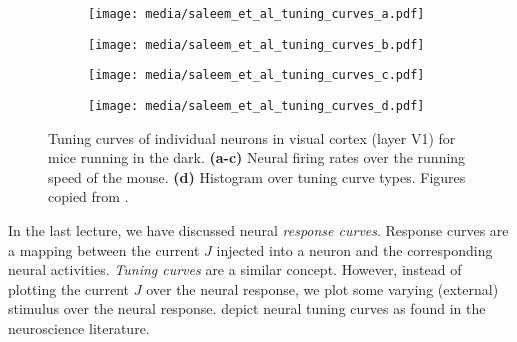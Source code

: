 \documentclass[10pt,letterpaper,oneside]{article}
\begin{document}
\begin{figure}[p]
	\hspace{0.5cm}
	\begin{subfigure}[b]{0.25\textwidth}%
		\centering%
		\hspace{-1cm}\texttt{[image: media/saleem\_et\_al\_tuning\_curves\_a.pdf]}%
		\caption{}%
		\label{fig:saleem_et_al_tuning_curves_a}%
	\end{subfigure}%
	\begin{subfigure}[b]{0.25\textwidth}%
		\centering%
		\hspace{-1cm}\texttt{[image: media/saleem\_et\_al\_tuning\_curves\_b.pdf]}%
		\caption{}%
		\label{fig:saleem_et_al_tuning_curves_b}%
	\end{subfigure}%
	\begin{subfigure}[b]{0.25\textwidth}%
		\centering%
		\hspace{-1cm}\texttt{[image: media/saleem\_et\_al\_tuning\_curves\_c.pdf]}%
		\caption{}%
		\label{fig:saleem_et_al_tuning_curves_c}%
	\end{subfigure}%
	\begin{subfigure}[b]{0.25\textwidth}%
		\centering%
		\hspace{-1cm}\texttt{[image: media/saleem\_et\_al\_tuning\_curves\_d.pdf]}%
		\caption{}%
		\label{fig:saleem_et_al_tuning_curves_d}%
	\end{subfigure}%
	\caption{Tuning curves of individual neurons in visual cortex (layer V1) for mice running in the dark. \textbf{(a-c)} Neural firing rates over the running speed of the mouse. \textbf{(d)} Histogram over tuning curve types. Figures copied from \cite{saleem2013integration}.}
	\label{fig:tuning_curves_2}
\end{figure}

In the last lecture, we have discussed neural \emph{response curves}. Response curves are a mapping between the current $J$ injected into a neuron and the corresponding neural activities. \emph{Tuning curves} are a similar concept. However, instead of plotting the current $J$ over the neural response, we plot some varying (external) stimulus over the neural response.  depict neural tuning curves as found in the neuroscience literature.

\end{document}
